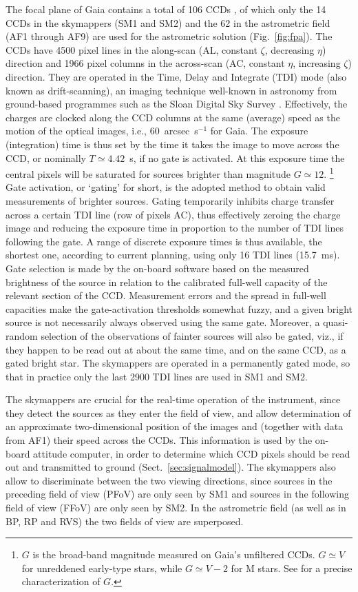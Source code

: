\documentclass[structabstract]{aa}
\begin{document}
The focal plane of Gaia contains a total of 106 CCDs \citep{2007SPIE.6690E...8L},
of which only the 14 CCDs in the skymappers (SM1 and SM2) and the 62 
in the astrometric field (AF1 through AF9) are used for the astrometric 
solution (Fig.~\ref{fig:fpa}). The CCDs have 4500 pixel lines in the
along-scan (AL, constant $\zeta$, decreasing $\eta$) direction 
and 1966 pixel columns in the
across-scan (AC, constant $\eta$, increasing $\zeta$) direction.
They are operated in the Time, Delay and Integrate (TDI)
mode (also known as drift-scanning), an imaging technique well-known
in astronomy from ground-based programmes such as the Sloan Digital
Sky Survey \citep{gunn+98}. Effectively, the charges are clocked along
the CCD columns at the same (average) speed as the motion of the optical
images, i.e., 60~arcsec~s$^{-1}$ for Gaia. The exposure (integration) time is 
thus set by the time it takes the image to move across the CCD, or nominally
$T\simeq 4.42$~s, if no gate is activated. 
At this exposure time the central pixels will be saturated for
sources brighter than magnitude $G\simeq 12$.%
\footnote{$G$ is the broad-band magnitude measured on Gaia's 
unfiltered CCDs. $G\simeq V$ for unreddened early-type stars, while
$G\simeq V-2$ for M stars. See \citet{2010A&A...523A..48J} for a 
precise characterization of $G$.}
Gate activation, or `gating' for short, is the adopted method to
obtain valid measurements of brighter sources. Gating temporarily 
inhibits charge transfer across a certain TDI line (row of pixels AC), 
thus effectively zeroing the charge image and reducing the exposure 
time in proportion to the number of TDI lines following 
the gate. A range of discrete exposure times is thus available,
the shortest one, according to current planning, using only 16 TDI lines 
(15.7~ms). Gate selection is made by the on-board software based 
on the measured brightness of the source in relation to the calibrated
full-well capacity of the relevant section of the CCD. Measurement errors 
and the spread in full-well capacities make the gate-activation thresholds 
somewhat fuzzy, and a given bright source is not necessarily always observed 
using the same gate. Moreover, a quasi-random selection of the observations 
of fainter sources will also be gated, viz., if they happen to be read out 
at about the same time, and on the same CCD, as a gated bright star.
The skymappers
are operated in a permanently gated mode, so that in practice only
the last 2900 TDI lines are used in SM1 and SM2.

The skymappers are crucial for the real-time operation of the instrument,
since they detect the sources as they enter the field of view, and allow
determination of an approximate two-dimensional position of the images and
(together with data from AF1) their speed across the CCDs. This information
is used by the on-board attitude computer, in order to determine which 
CCD pixels should be read out and transmitted to ground (Sect.~\ref{sec:signalmodel}). 
The skymappers 
also allow to discriminate between the two viewing directions, since sources
in the preceding field of view (PFoV) are only seen by SM1 and sources
in the following field of view (FFoV) are only seen by SM2. In the
astrometric field (as well as in BP, RP and RVS) the two fields of view are 
superposed.
\end{document}
